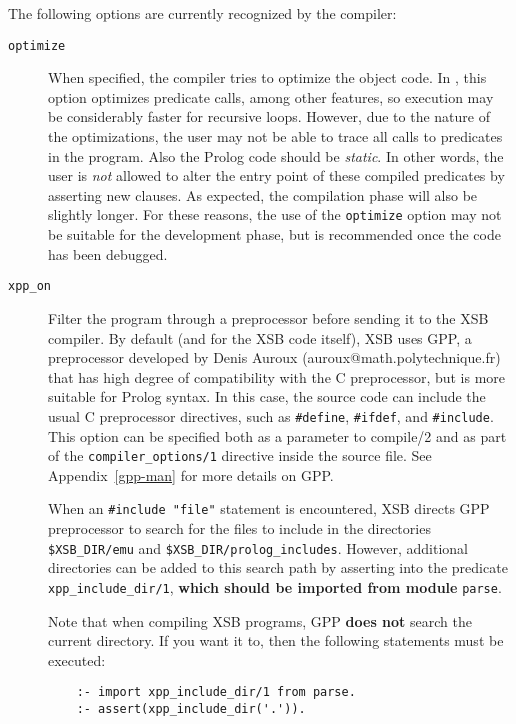 The following options are currently recognized by the compiler:
\begin{description}
\item[{\tt optimize}]
	When specified, the compiler tries to optimize the object code.
	In \version, this option optimizes predicate calls, among other
	features, so execution may be considerably faster for recursive
	loops.  However,
	due to the nature of the optimizations, the user may not be able to
	trace all calls to predicates in the program.  Also the Prolog code
	should be {\em static}.  In other words, the user is {\em not} allowed
	to alter the entry point of these compiled predicates by asserting new
	clauses.  As expected, the compilation phase will also be slightly
	longer.  For these reasons, the use of the {\tt optimize} option may
	not be suitable for the development phase, but is
	recommended once the code has been debugged.


\item[{\tt xpp\_on}]
  Filter the program through a preprocessor  before sending it to the XSB 
  compiler. By default (and for the XSB code itself), XSB uses GPP, a
  preprocessor developed by Denis Auroux (auroux@math.polytechnique.fr)
  that has high degree of compatibility with the C preprocessor, but is
  more suitable for Prolog syntax. In this case, the source code can
  include the usual C 
  preprocessor directives, such as \verb|#define|, \verb|#ifdef|, and
  \verb|#include|. This option can be specified both as a parameter to
  compile/2 and as part of the {\tt compiler\_options/1} directive inside
  the source file. See Appendix~\ref{gpp-man} for more details on GPP.

  When an \verb|#include "file"| statement is encountered,
  XSB directs GPP preprocessor to search for the files to include in the
  directories \verb|$XSB_DIR/emu| 
  and \verb|$XSB_DIR/prolog_includes|.
  However, additional directories can be added to this search path by
  asserting into the predicate \verb|xpp_include_dir/1|, {\bf which should
  be imported from module} {\tt parse}.

  Note that when compiling XSB programs, GPP {\bf does not} search the
  current directory. If you want it to, then the following statements must
  be executed:
\begin{verbatim}
    :- import xpp_include_dir/1 from parse.
    :- assert(xpp_include_dir('.')).
\end{verbatim}


\end{description}
